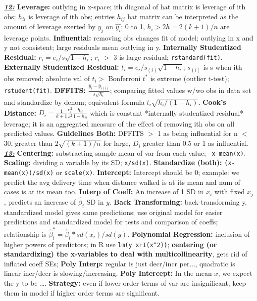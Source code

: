 \documentclass[8pt]{extarticle}
\begin{document}
\textit{\textbf{\underline{12:}}}
\textbf{Leverage:} outlying in x-space; ith diagonal of hat matrix is leverage
of ith obs; $h_{ii}$ is leverage of ith obs; entries $h_{ij}$ hat matrix can be 
interpreted as the amount of leverage exerted by $y_j$ on $\hat{y_i}$; 
0 to 1, $h_i > 2\bar{h} = 2(k+1)/n$ are leverage points.
\textbf{Influential:} removing obs changes fit of model; outlying in x and y not
consistent; large residuals mean outlying in y.
\textbf{Internally Studentized Residual:} $r_i = e_i / s\sqrt{1 - h_{i}}$; $r_i$
$>$ 3 is large residual; \texttt{rstandard(fit)}.
\textbf{Externally Studentized Residual:} $t_i = e_i / s_{(i)}\sqrt{1 - h_{i}}$;
$s_{(i)}$ is s when ith obs removed; absolute val of 
$t_i >$ Bonferroni $t^*$ is extreme (outlier t-test); \texttt{rstudent(fit)}.
\textbf{DFFITS:} $\frac{\hat{y}_i - \hat{y}_{i(i)}}{s\sqrt{h_{i}}}$; comparing 
fitted values w/wo obs in data set and standardize by denom; equivalent formula
$t_i\sqrt{h_{i}/(1 - h_{i})}$.
\textbf{Cook's Distance:} $D_i = \frac{1}{k+1}\frac{e_i^2}{s^2}
\frac{h_{ii}}{1 - h_{ii}}$ which is constant *internally studentized residual*
leverage; it is an aggregated measure of the effect of removing ith obs on all
predicted values.
\textbf{Guidelines Both:} DFFITS $>$ 1 as being influential for n $<$ 30, 
greater than $2\sqrt{(k+1)/n}$ for large, $D_i$ greater than 0.5 or 1 as 
influential.\\

\textit{\textbf{\underline{13:}}}
\textbf{Centering:} substracting sample mean of var from each value; \texttt{
x-mean(x)}.
\textbf{Scaling:} dividing a variable by its SD; \texttt{x/sd(x)}.
\textbf{Standardize (both):} \texttt{(x-mean(x))/sd(x)} or \texttt{scale(x)}.
\textbf{Intercept:} Intercept should be 0; example: we predict the avg delivery 
time when distance walked is at its mean and num of cases is at its mean too.
\textbf{Interp of Coeff:} An increase of 1 SD in $x_i$ with fixed $x_j$, predicts 
an increase of $\hat{\beta}_i$ SD in $y$.
\textbf{Back Transforming:} back-transforming y, standardized model gives 
same predictions; use original model for easier predictions and standardized 
model for tests and comparison of coeffs; relationship is $\hat{\beta}^*_i = 
\hat{\beta}_i * sd(x_i) / sd(y)$.
\textbf{Polynomial Regression:} inclusion of higher powers of predictors; 
in R use \texttt{lm(y~x+I(x\^{}2))}; \textbf{centering (or standardizing) the 
x-variables to deal with multicollinearity}, gets rid of inflated coeff SEs;
\textbf{Poly Interp:} regular is just decr/incr per..., quadratic is linear 
incr/decr is slowing/increasing.
\textbf{Poly Intercept:} In the mean $x$, we expect the y to be \dots.
\textbf{Strategy:} even if lower order terms of var are insignificant, keep
them in model if higher order terms are significant.\\
\end{document}
